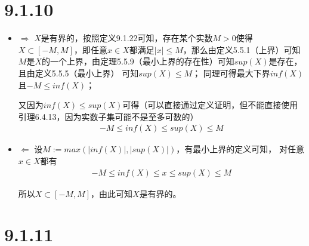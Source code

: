 \documentclass{article}
\begin{document}
\section*{9.1.10}

\begin{itemize}
      \item $\Rightarrow$ $X$是有界的，按照定义9.1.22可知，存在某个实数$M > 0$使得
            $X \subset [-M, M]$，即任意$x \in X$都满足$|x| \leq M$，那么由定义5.5.1（上界）可知
            $M$是$X$的一个上界，由定理5.5.9（最小上界的存在性）可知$sup(X)$是存在，且由定义5.5.5（最小上界）
            可知$sup(X) \leq M$；
            同理可得最大下界$inf(X)$且$-M \leq inf(X)$；

            又因为$inf(X) \leq sup(X)$可得（可以直接通过定义证明，但不能直接使用引理6.4.13，因为实数子集可能不是至多可数的）
            \begin{align*}
                  -M \leq inf(X) \leq sup(X) \leq M
            \end{align*}

      \item $\Leftarrow$ 设$M := max(|inf(X)|, |sup(X)|)$，有最小上界的定义可知，
            对任意$x \in X$都有
            \begin{align*}
                -M \leq  inf(X) \leq x \leq sup(X) \leq M
            \end{align*}

            所以$X \subset [-M, M]$，由此可知$X$是有界的。
\end{itemize}

\section*{9.1.11}
\end{document}
